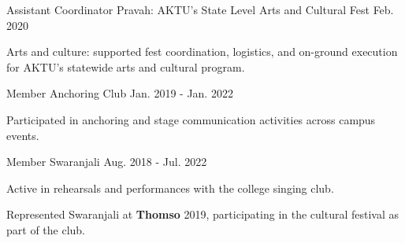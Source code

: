 

\begin{cventries}

  \cventry
    {Assistant Coordinator} %
    {Pravah: AKTU's State Level Arts and Cultural Fest} %
    {} %
    {Feb. 2020} %
    {
      \begin{cvitems} %
        \item {Arts and culture: supported fest coordination, logistics, and on-ground execution for AKTU's statewide arts and cultural program.}
      \end{cvitems}
    }

  \cventry
    {Member} %
    {Anchoring Club} %
    {} %
    {Jan. 2019 - Jan. 2022} %
    {
      \begin{cvitems} %
        \item {Participated in anchoring and stage communication activities across campus events.}
      \end{cvitems}
    }

  \cventry
    {Member} %
    {Swaranjali} %
    {} %
    {Aug. 2018 - Jul. 2022} %
    {
      \begin{cvitems} %
        \item {Active in rehearsals and performances with the college singing club.}
        \item {Represented Swaranjali at \textbf{Thomso} 2019, participating in the cultural festival as part of the club.}
      \end{cvitems}
    }

\end{cventries}
